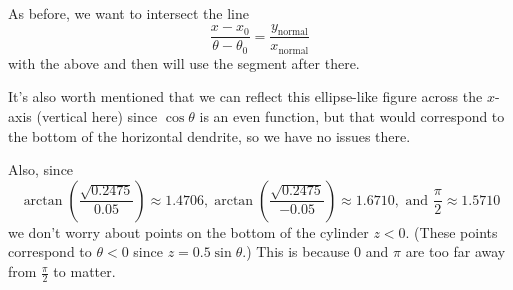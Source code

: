 \documentclass[a4paper,10pt]{article}
\begin{document}
\begin{center}
\end{center}

As before, we want to intersect the line
\[\frac{x - x_0}{\theta - \theta_0} = \frac{y_{\text{normal}}}{
x_{\text{normal}}}\]
with the above and then will use the segment after there.

It's also worth mentioned that we can reflect this ellipse-like figure
across the \(x\)-axis (vertical here) since \(\cos \theta\) is an
even function, but that would correspond to the bottom of the horizontal
dendrite, so we have no issues there.

Also, since
\[\arctan\left(\frac{\sqrt{0.2475}}{0.05}\right) \approx 1.4706,
\arctan\left(\frac{\sqrt{0.2475}}{-0.05}\right) \approx 1.6710, \text{ and }
\frac{\pi}{2} \approx 1.5710\]
we don't worry about points on the bottom of the cylinder \(z < 0\). (These
points correspond to \(\theta < 0\) since \(z = 0.5 \sin \theta\).) This
is because \(0\) and \(\pi\) are too far away from \(\frac{\pi}{2}\)
to matter.
\end{document}

